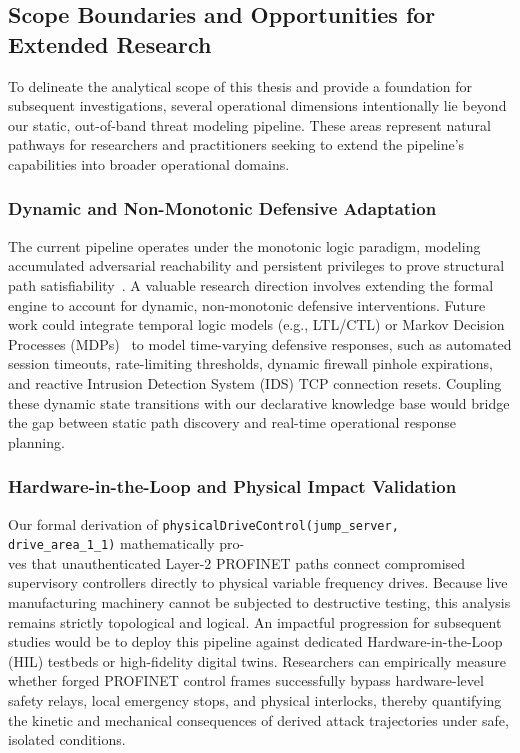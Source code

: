 \documentclass[target=mst,aauheader=aics,style=]{thud}
\begin{document}
\subsection{Scope Boundaries and Opportunities for Extended Research}
\label{sec:scope_boundaries}

To delineate the analytical scope of this thesis and provide a foundation for subsequent investigations, several operational dimensions intentionally lie beyond our static, out-of-band threat modeling pipeline. These areas represent natural pathways for researchers and practitioners seeking to extend the pipeline's capabilities into broader operational domains.

\subsubsection{Dynamic and Non-Monotonic Defensive Adaptation}
The current pipeline operates under the monotonic logic paradigm, modeling accumulated adversarial reachability and persistent privileges to prove structural path satisfiability~\cite{Ou05}. A valuable research direction involves extending the formal engine to account for dynamic, non-monotonic defensive interventions. Future work could integrate temporal logic models (e.g., LTL/CTL) or Markov Decision Processes (MDPs)~\cite{WachterSurvey} to model time-varying defensive responses, such as automated session timeouts, rate-limiting thresholds, dynamic firewall pinhole expirations, and reactive Intrusion Detection System (IDS) TCP connection resets. Coupling these dynamic state transitions with our declarative knowledge base would bridge the gap between static path discovery and real-time operational response planning.

\subsubsection{Hardware-in-the-Loop and Physical Impact Validation}
Our formal derivation of \texttt{physicalDriveControl(jump\_server, drive\_area\_1\_1)} mathematically pro-\\ves that unauthenticated Layer-2 PROFINET paths connect compromised supervisory controllers directly to physical variable frequency drives. Because live manufacturing machinery cannot be subjected to destructive testing, this analysis remains strictly topological and logical. An impactful progression for subsequent studies would be to deploy this pipeline against dedicated Hardware-in-the-Loop (HIL) testbeds or high-fidelity digital twins. Researchers can empirically measure whether forged PROFINET control frames successfully bypass hardware-level safety relays, local emergency stops, and physical interlocks, thereby quantifying the kinetic and mechanical consequences of derived attack trajectories under safe, isolated conditions.
\end{document}
